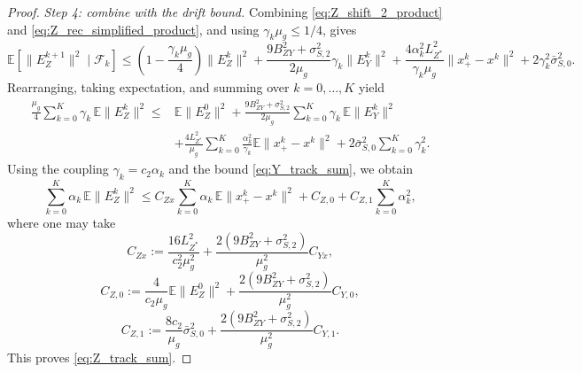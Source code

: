 \documentclass{pkumelon}
\theoremstyle{plain}
\newcommand{\E}{\mathbb{E}}
\begin{document}
\begin{proof}
\emph{Step 4: combine with the drift bound.} Combining \eqref{eq:Z_shift_2_product} and \eqref{eq:Z_rec_simplified_product}, and using $\gamma_k\mu_g\le 1/4$, gives
{\small
\begin{equation}\label{eq:Z_one_step_final_product}
\E[\|E_Z^{k+1}\|^2\mid \mathcal F_k]
\le
\left(1-\frac{\gamma_k\mu_g}{4}\right)\|E_Z^k\|^2+\frac{9B_{ZY}^2+\sigma_{S,2}^2}{2\mu_g}\gamma_k\|E_Y^k\|^2 +\frac{4\alpha_k^2L_{Z^*}^2}{\gamma_k\mu_g}\|x_+^k-x^k\|^2
+2\gamma_k^2\bar\sigma_{S,0}^2.
\end{equation}
}
Rearranging, taking expectation, and summing over $k=0,\ldots,K$ yield
\begin{equation}\label{eq:Z_sum_gamma_product}
\begin{aligned}
\frac{\mu_g}{4}\sum_{k=0}^{K}\gamma_k\,\E\|E_Z^k\|^2
\le{}&
\E\|E_Z^0\|^2
+\frac{9B_{ZY}^2+\sigma_{S,2}^2}{2\mu_g}\sum_{k=0}^{K}\gamma_k\,\E\|E_Y^k\|^2 \\
&+\frac{4L_{Z^*}^2}{\mu_g}\sum_{k=0}^{K}\frac{\alpha_k^2}{\gamma_k}\E\|x_+^k-x^k\|^2
+2\bar\sigma_{S,0}^2\sum_{k=0}^{K}\gamma_k^2.
\end{aligned}
\end{equation}
Using the coupling $\gamma_k=c_2\alpha_k$ and the bound \eqref{eq:Y_track_sum}, we obtain
\begin{equation*}
\sum_{k=0}^{K}\alpha_k\,\E\|E_Z^k\|^2 \le C_{Zx}\sum_{k=0}^{K}\alpha_k\,\E\|x_+^k-x^k\|^2 +C_{Z,0} +C_{Z,1}\sum_{k=0}^{K}\alpha_k^2,
\end{equation*}
where one may take
\begin{equation*}
C_{Zx}:=\frac{16L_{Z^*}^2}{c_2^2\mu_g^2} +\frac{2(9B_{ZY}^2+\sigma_{S,2}^2)}{\mu_g^2}C_{Yx},
\end{equation*}
\begin{equation*}
C_{Z,0}:=\frac{4}{c_2\mu_g}\E\|E_Z^0\|^2 +\frac{2(9B_{ZY}^2+\sigma_{S,2}^2)}{\mu_g^2}C_{Y,0},
\end{equation*}
\begin{equation*}
C_{Z,1}:=\frac{8c_2}{\mu_g}\bar\sigma_{S,0}^2 +\frac{2(9B_{ZY}^2+\sigma_{S,2}^2)}{\mu_g^2}C_{Y,1}.
\end{equation*}
This proves \eqref{eq:Z_track_sum}.
\end{proof}
\end{document}
